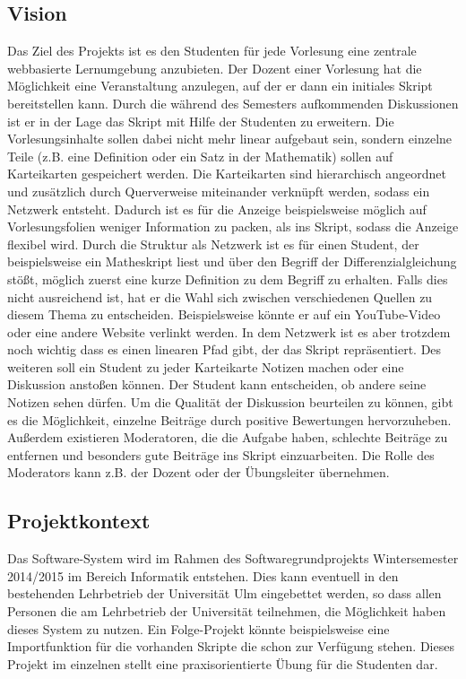 \documentclass[12pt,a4paper]{article}
\begin{document}
\newpage

\subsection{Vision}
Das Ziel des Projekts ist es den Studenten für jede Vorlesung eine zentrale webbasierte Lernumgebung anzubieten. Der Dozent einer Vorlesung hat die Möglichkeit eine Veranstaltung anzulegen, auf der er dann ein initiales Skript bereitstellen kann. Durch die während des Semesters aufkommenden Diskussionen ist er in der Lage das Skript mit Hilfe der Studenten zu erweitern. Die Vorlesungsinhalte sollen dabei nicht mehr linear aufgebaut sein, sondern einzelne Teile (z.B. eine Definition oder ein Satz in der Mathematik) sollen auf Karteikarten gespeichert werden. Die Karteikarten sind hierarchisch angeordnet und zusätzlich durch Querverweise miteinander verknüpft werden, sodass ein Netzwerk entsteht. Dadurch ist es für die Anzeige beispielsweise möglich auf Vorlesungsfolien weniger Information zu packen, als ins Skript, sodass die Anzeige flexibel wird. Durch die Struktur als Netzwerk ist es für einen Student, der beispielsweise ein Matheskript liest und über den Begriff der Differenzialgleichung stößt, möglich zuerst eine kurze Definition zu dem Begriff zu erhalten. Falls dies nicht ausreichend ist, hat er die Wahl sich zwischen verschiedenen Quellen zu diesem Thema zu entscheiden. Beispielsweise könnte er auf ein YouTube-Video oder eine andere Website verlinkt werden. In dem Netzwerk ist es aber trotzdem noch wichtig dass es einen linearen Pfad gibt, der das Skript repräsentiert. Des weiteren soll ein Student zu jeder Karteikarte Notizen machen oder eine Diskussion anstoßen können. Der Student kann entscheiden, ob andere seine Notizen sehen dürfen. Um die Qualität der Diskussion beurteilen zu können, gibt es die Möglichkeit, einzelne Beiträge durch positive Bewertungen hervorzuheben. Außerdem existieren Moderatoren, die die Aufgabe haben, schlechte Beiträge zu entfernen und besonders gute Beiträge ins Skript einzuarbeiten. Die Rolle des Moderators kann z.B. der Dozent oder der Übungsleiter übernehmen.


\subsection{Projektkontext}
Das Software-System wird im Rahmen des Softwaregrundprojekts Wintersemester 2014/2015 im Bereich Informatik entstehen. Dies kann eventuell in den bestehenden Lehrbetrieb der Universität Ulm eingebettet werden, so dass allen Personen die am Lehrbetrieb der Universität teilnehmen, die Möglichkeit haben dieses System zu nutzen. Ein Folge-Projekt könnte beispielsweise eine Importfunktion für die vorhanden Skripte die schon zur Verfügung stehen. Dieses Projekt im einzelnen stellt eine praxisorientierte Übung für die Studenten dar.
 
\end{document}
